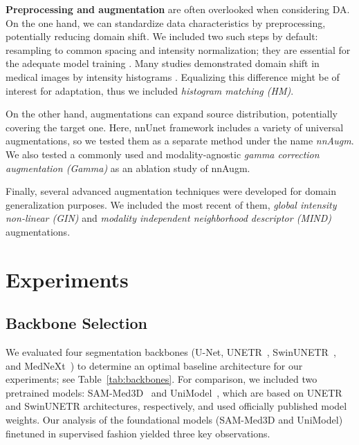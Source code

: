 \textbf{Preprocessing and augmentation} are often overlooked when considering DA. On the one hand, we can standardize data characteristics by preprocessing, potentially reducing domain shift. We included two such steps by default: resampling to common spacing and intensity normalization; they are essential for the adequate model training \cite{kondrateva2022negligible}. Many studies demonstrated domain shift in medical images by intensity histograms \cite{crossmoda,se_medim,ihf}. Equalizing this difference might be of interest for adaptation, thus we included \textit{histogram matching (HM)}.

On the other hand, augmentations can expand source distribution, potentially covering the target one. Here, nnUnet framework \cite{nnunet} includes a variety of universal augmentations, so we tested them as a separate method under the name \textit{nnAugm}. We also tested a commonly used and modality-agnostic \textit{gamma correction augmentation (Gamma)} as an ablation study of nnAugm.

Finally, several advanced augmentation techniques were developed for domain generalization purposes. We included the most recent of them, \textit{global intensity non-linear (GIN)} \cite{gin} and \textit{modality independent neighborhood descriptor (MIND)} \cite{dg_tta} augmentations.



\section{Experiments}


\subsection{Backbone Selection}

We evaluated four segmentation backbones (U-Net, UNETR~\cite{unetr}, SwinUNETR~\cite{swinunetr}, and MedNeXt~\cite{mednext}) to determine an optimal baseline architecture for our experiments; see Table~\ref{tab:backbones}. For comparison, we included two pretrained models: SAM-Med3D~\cite{sammed} and UniModel~\cite{unimodel}, which are based on UNETR and SwinUNETR architectures, respectively, and used officially published model weights. Our analysis of the foundational models (SAM-Med3D and UniModel) finetuned in supervised fashion yielded three key observations.

